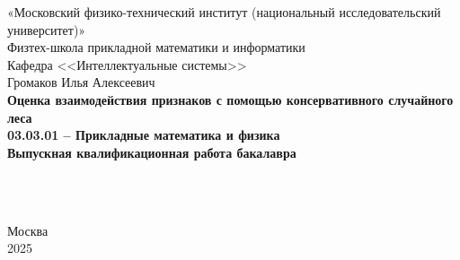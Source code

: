 \thispagestyle{empty}
\begin{center}
    \sc
        «Московский физико-технический институт \rm{(национальный исследовательский университет)}»\\
        Физтех-школа прикладной математики и информатики\\
        Кафедра <<Интеллектуальные системы>>
        \\[10mm]
    \rm\large
        Громаков Илья Алексеевич\\[10mm]
    \bf\Large
		Оценка взаимодействия признаков с помощью консервативного случайного леса\\[10mm]
    \rm\normalsize
        03.03.01 -- Прикладные математика и физика\\[10mm]
    \sc
        Выпускная квалификационная работа бакалавра\\[5mm]
\end{center}
\hfill\parbox{85mm}{
    \begin{flushleft}
    \bf
        \\
    \rm
        \\
    \end{flushleft}
}
\begin{center}
    Москва\\
    2025
\end{center}
